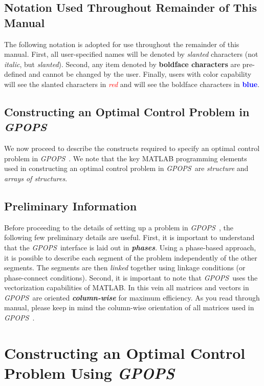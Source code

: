 \documentclass[10pt]{article}
\newcommand{\gpops}{{\em GPOPS}~}
\newcommand{\bfblue}[1]{\textcolor{blue}{\bf #1}}
\newcommand{\slred}[1]{\textcolor{red}{\sl #1}}
\begin{document}
\subsection{Notation Used Throughout Remainder of This Manual}

The following notation is adopted for use throughout the remainder of this
manual.  First, all user-specified names will be denoted by {\sl slanted}
characters (not {\em italic}, but {\sl slanted}).  Second, any item denoted by
{\bf boldface characters}  are pre-defined and cannot be changed by the user.
Finally, users with color capability will see the slanted characters in
\slred{red} and will see the boldface characters in \bfblue{blue}.

\subsection{Constructing an Optimal Control Problem in \gpops}

We now proceed to describe the constructs required to specify an
optimal control problem in \gpops.  We note that the key
MATLAB programming elements used in constructing an optimal control
problem in \gpops are {\em structure} and {\em arrays of structures}.

\subsection{Preliminary Information}

Before proceeding to the details of setting up a problem in
\gpops, the following few preliminary details are useful.  First,
it is important to understand that the \gpops interface is laid
out in {\bf\em phases}.  Using a phase-based approach, it is possible
to describe each segment of the problem independently of the other
segments.  The segments are then {\em linked} together using linkage
conditions (or phase-connect conditions).  Second, it is important to
note that \gpops uses the vectorization capabilities of MATLAB.
In this vein all matrices and vectors in \gpops are oriented
{\bf\em column-wise} for maximum efficiency.  As you read through
manual, please keep in mind the column-wise orientation of all
matrices used in \gpops.

\section{Constructing an Optimal Control Problem Using \gpops}
\end{document}
